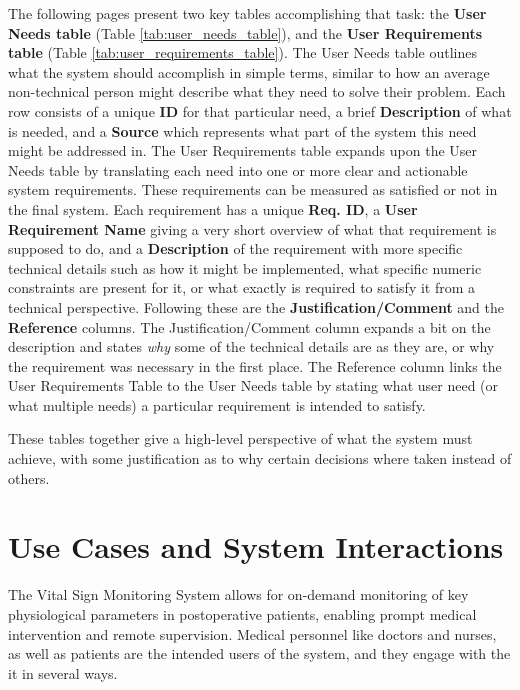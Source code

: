 The following pages present two key tables accomplishing that task: the \textbf{User Needs table} (Table \ref{tab:user_needs_table}), and the \textbf{User Requirements table} (Table \ref{tab:user_requirements_table}). The User Needs table outlines what the system should accomplish in simple terms, similar to how an average non-technical person might describe what they need to solve their problem. Each row consists of a unique \textbf{ID} for that particular need, a brief \textbf{Description} of what is needed, and a \textbf{Source} which represents what part of the system this need might be addressed in. The User Requirements table expands upon the User Needs table by translating each need into one or more clear and actionable system requirements. These requirements can be measured as satisfied or not in the final system. Each requirement has a unique \textbf{Req. ID}, a \textbf{User Requirement Name} giving a very short overview of what that requirement is supposed to do, and a \textbf{Description} of the requirement with more specific technical details such as how it might be implemented, what specific numeric constraints are present for it, or what exactly is required to satisfy it from a technical perspective. Following these are the \textbf{Justification/Comment} and the \textbf{Reference} columns. The Justification/Comment column expands a bit on the description and states \textit{why} some of the technical details are as they are, or why the requirement was necessary in the first place. The Reference column links the User Requirements Table to the User Needs table by stating what user need (or what multiple needs) a particular requirement is intended to satisfy.

These tables together give a high-level perspective of what the system must achieve, with some justification as to why certain decisions where taken instead of others.


\clearpage

\clearpage

\section{Use Cases and System Interactions} %
The Vital Sign Monitoring System allows for on-demand monitoring of key physiological parameters in postoperative patients, enabling prompt medical intervention and remote supervision. Medical personnel like doctors and nurses, as well as patients are the intended users of the system, and they engage with the it in several ways.

